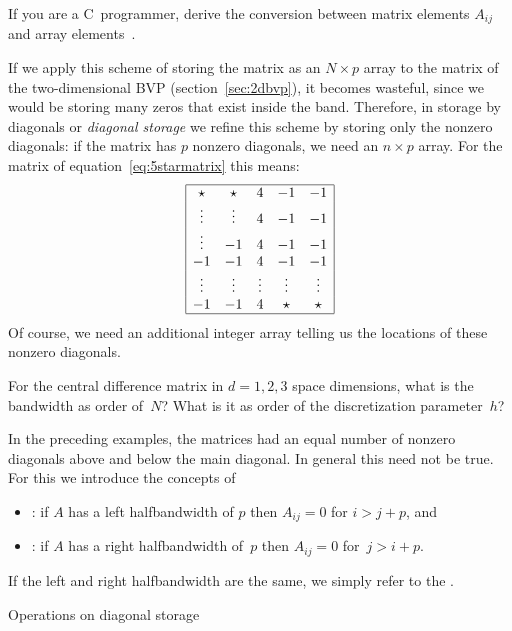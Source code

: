 \begin{exercise}
  If you are a C~programmer, derive the conversion between matrix
  elements $A_{ij}$ and array elements~.
\end{exercise}

If we apply this scheme of storing the matrix as an $N\times p$ array
to the matrix of the two-dimensional \ac{BVP}
(section~\ref{sec:2dbvp}), it becomes wasteful, since we would be
storing many zeros that exist inside the band.
Therefore, in storage by diagonals or
\emph{diagonal storage}
we refine
this scheme by storing only the nonzero diagonals: if the matrix has
$p$ nonzero diagonals, we need an $n\times p$ array. For the matrix of
equation~\eqref{eq:5starmatrix} this means:
\[
\begin{array}{|ccccc|}
  \hline
  \star&\star&4&-1&-1\\
  \vdots&\vdots&4&-1&-1\\
  \vdots&-1&4&-1&-1\\
  -1&-1&4&-1&-1\\
  \vdots&\vdots&\vdots&\vdots&\vdots\\
  -1&-1&4&\star&\star\\ \hline
\end{array}
\]
Of course, we need an additional integer array telling us the
locations of these nonzero diagonals.

\begin{exercise}
  For the central difference matrix in $d=1,2,3$ space dimensions,
  what is the bandwidth as order of~$N$? What is it as order of the
  discretization parameter~$h$?
\end{exercise}

In the preceding examples, the matrices had an equal number of nonzero
diagonals above and below the main diagonal. In general this need not
be true. For this we introduce the concepts of
\begin{itemize}
\item {}: if $A$ has a left
  halfbandwidth of $p$ then $A_{ij}=0$ for $i>j+p$, and
\item {}: if $A$ has a right
  halfbandwidth of~$p$ then $A_{ij}=0$ for~\mbox{$j>i+p$}.
\end{itemize}
If the left and right halfbandwidth are the same, we simply refer to
the .

 {Operations on diagonal storage}

